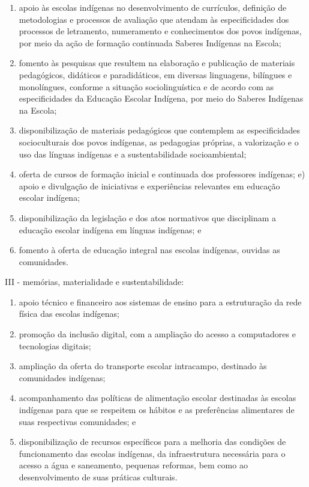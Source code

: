 \documentclass[
]{book}
\begin{document}
\begin{enumerate}
\def\labelenumi{\alph{enumi})}
\item
  apoio às escolas indígenas no desenvolvimento de currículos, definição de metodologias e processos de avaliação que atendam às especificidades dos processos de letramento, numeramento e conhecimentos dos povos indígenas, por meio da ação de formação continuada Saberes Indígenas na Escola;
\item
  fomento às pesquisas que resultem na elaboração e publicação de materiais pedagógicos, didáticos e paradidáticos, em diversas linguagens, bilíngues e monolíngues, conforme a situação sociolinguística e de acordo com as especificidades da Educação Escolar Indígena, por meio do Saberes Indígenas na Escola;
\item
  disponibilização de materiais pedagógicos que contemplem as especificidades socioculturais dos povos indígenas, as pedagogias próprias, a valorização e o uso das línguas indígenas e a sustentabilidade socioambiental;
\item
  oferta de cursos de formação inicial e continuada dos professores indígenas; e) apoio e divulgação de iniciativas e experiências relevantes em educação escolar indígena;
\item
  disponibilização da legislação e dos atos normativos que disciplinam a educação escolar indígena em línguas indígenas; e
\item
  fomento à oferta de educação integral nas escolas indígenas, ouvidas as comunidades.
\end{enumerate}

III - memórias, materialidade e sustentabilidade:

\begin{enumerate}
\def\labelenumi{\alph{enumi})}
\item
  apoio técnico e financeiro aos sistemas de ensino para a estruturação da rede física das escolas indígenas;
\item
  promoção da inclusão digital, com a ampliação do acesso a computadores e tecnologias digitais;
\item
  ampliação da oferta do transporte escolar intracampo, destinado às comunidades indígenas;
\item
  acompanhamento das políticas de alimentação escolar destinadas às escolas indígenas para que se respeitem os hábitos e as preferências alimentares de suas respectivas comunidades; e
\item
  disponibilização de recursos específicos para a melhoria das condições de funcionamento das escolas indígenas, da infraestrutura necessária para o acesso a água e saneamento, pequenas reformas, bem como ao desenvolvimento de suas práticas culturais.
\end{enumerate}
\end{document}
